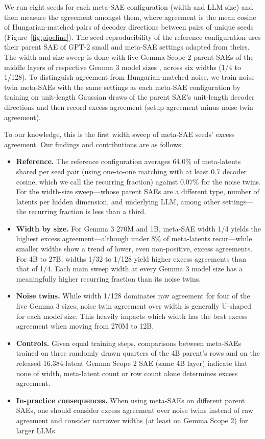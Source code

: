 We run eight seeds for each meta-SAE configuration (width and LLM size) and then measure the agreement amongst them, where agreement is the mean cosine of Hungarian-matched pairs of decoder directions between pairs of unique seeds (Figure~\ref{fig:pipeline}). The seed-reproducibility of the reference configuration uses their parent SAE of GPT-2 small and meta-SAE settings adapted from theirs. The width-and-size sweep is done with five Gemma Scope 2 parent SAEs \citep{mcdougall2025gemmascope2} of the middle layers of respective Gemma 3 model sizes \citep[270M, 1B, 4B, 12B, and 27B;][]{gemmateam2025gemma3,googledeepmind2025gemma3card}, across six widths (1/4 to 1/128). To distinguish agreement from Hungarian-matched noise, we train noise twin meta-SAEs with the same settings as each meta-SAE configuration by training on unit-length Gaussian draws of the parent SAE's unit-length decoder directions and then record excess agreement (setup agreement minus noise twin agreement).

To our knowledge, this is the first width sweep of meta-SAE seeds' excess agreement. Our findings and contributions are as follows:
\begin{itemize}
  \item \textbf{Reference.} The reference configuration averages 64.0\% of meta-latents shared per seed pair (using one-to-one matching with at least 0.7 decoder cosine, which we call the recurring fraction) against 0.07\% for the noise twins. For the width-size sweep---whose parent SAEs are a different type, number of latents per hidden dimension, and underlying LLM, among other settings---the recurring fraction is less than a third.
  \item \textbf{Width by size.} For Gemma 3 270M and 1B, meta-SAE width 1/4 yields the highest excess agreement---although under 8\% of meta-latents recur---while smaller widths show a trend of lower, even non-positive, excess agreements. For 4B to 27B, widths 1/32 to 1/128 yield higher excess agreements than that of 1/4. Each main sweep width at every Gemma 3 model size has a meaningfully higher recurring fraction than its noise twins.
  \item \textbf{Noise twins.} While width 1/128 dominates raw agreement for four of the five Gemma 3 sizes, noise twin agreement over width is generally U-shaped for each model size. This heavily impacts which width has the best excess agreement when moving from 270M to 12B.
  \item \textbf{Controls.} Given equal training steps, comparisons between meta-SAEs trained on three randomly drawn quarters of the 4B parent's rows and on the released 16,384-latent Gemma Scope 2 SAE (same 4B layer) indicate that none of width, meta-latent count or row count alone determines excess agreement.
  \item \textbf{In-practice consequences.} When using meta-SAEs on different parent SAEs, one should consider excess agreement over noise twins instead of raw agreement and consider narrower widths (at least on Gemma Scope 2) for larger LLMs.
\end{itemize}

